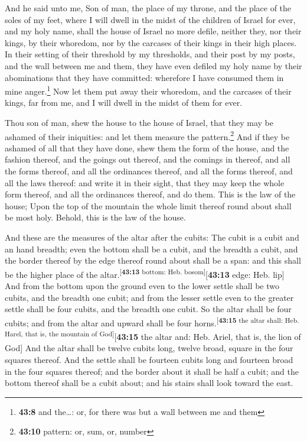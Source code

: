  And he said unto me, Son of man, the place of my throne,
and the place of the soles of my feet, where I will dwell in the midst
of the children of Israel for ever, and my holy name, shall the house of
Israel no more defile, neither they, nor their kings, by their whoredom,
nor by the carcases of their kings in their high places. 
In their setting of their threshold by my thresholds, and their post by
my posts, and the wall between me and them, they have even defiled my
holy name by their abominations that they have committed: wherefore I
have consumed them in mine anger.\footnote{\textbf{43:8} and the\ldots:
  or, for there was but a wall between me and them}  Now
let them put away their whoredom, and the carcases of their kings, far
from me, and I will dwell in the midst of them for ever.

 Thou son of man, shew the house to the house of Israel,
that they may be ashamed of their iniquities: and let them measure the
pattern.\footnote{\textbf{43:10} pattern: or, sum, or, number}
 And if they be ashamed of all that they have done, shew
them the form of the house, and the fashion thereof, and the goings out
thereof, and the comings in thereof, and all the forms thereof, and all
the ordinances thereof, and all the forms thereof, and all the laws
thereof: and write it in their sight, that they may keep the whole form
thereof, and all the ordinances thereof, and do them. 
This is the law of the house; Upon the top of the mountain the whole
limit thereof round about shall be most holy. Behold, this is the law of
the house.

 And these are the measures of the altar after the
cubits: The cubit is a cubit and an hand breadth; even the bottom shall
be a cubit, and the breadth a cubit, and the border thereof by the edge
thereof round about shall be a span: and this shall be the higher place
of the altar.\textsuperscript{{[}\textbf{43:13} bottom: Heb.
bosom{]}}{[}\textbf{43:13} edge: Heb. lip{]}  And from
the bottom upon the ground even to the lower settle shall be two cubits,
and the breadth one cubit; and from the lesser settle even to the
greater settle shall be four cubits, and the breadth one cubit.
 So the altar shall be four cubits; and from the altar
and upward shall be four horns.\textsuperscript{{[}\textbf{43:15} the
altar shall: Heb. Harel, that is, the mountain of
God{]}}{[}\textbf{43:15} the altar and: Heb. Ariel, that is, the lion of
God{]}  And the altar shall be twelve cubits long, twelve
broad, square in the four squares thereof.  And the
settle shall be fourteen cubits long and fourteen broad in the four
squares thereof; and the border about it shall be half a cubit; and the
bottom thereof shall be a cubit about; and his stairs shall look toward
the east.

